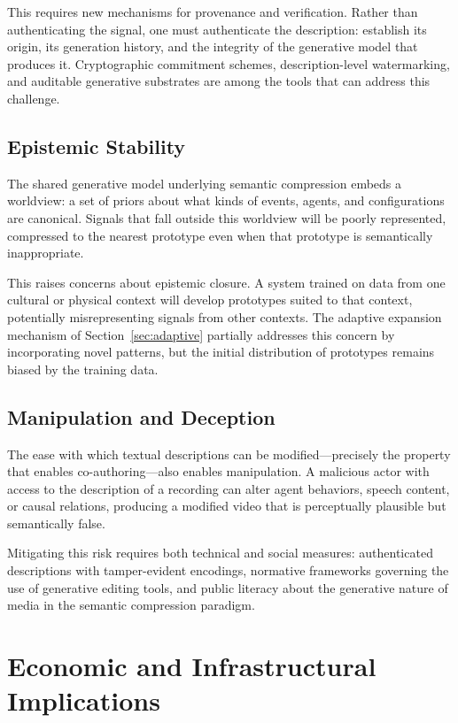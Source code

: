 \documentclass[12pt,a4paper]{article}
\theoremstyle{definition}
\theoremstyle{remark}
\begin{document}
This requires new mechanisms for provenance and verification. Rather than authenticating the signal, one must authenticate the description: establish its origin, its generation history, and the integrity of the generative model that produces it. Cryptographic commitment schemes, description-level watermarking, and auditable generative substrates are among the tools that can address this challenge.

\subsection{Epistemic Stability}

The shared generative model underlying semantic compression embeds a worldview: a set of priors about what kinds of events, agents, and configurations are canonical. Signals that fall outside this worldview will be poorly represented, compressed to the nearest prototype even when that prototype is semantically inappropriate.

This raises concerns about epistemic closure. A system trained on data from one cultural or physical context will develop prototypes suited to that context, potentially misrepresenting signals from other contexts. The adaptive expansion mechanism of Section~\ref{sec:adaptive} partially addresses this concern by incorporating novel patterns, but the initial distribution of prototypes remains biased by the training data.

\subsection{Manipulation and Deception}

The ease with which textual descriptions can be modified---precisely the property that enables co-authoring---also enables manipulation. A malicious actor with access to the description of a recording can alter agent behaviors, speech content, or causal relations, producing a modified video that is perceptually plausible but semantically false.

Mitigating this risk requires both technical and social measures: authenticated descriptions with tamper-evident encodings, normative frameworks governing the use of generative editing tools, and public literacy about the generative nature of media in the semantic compression paradigm.

\section{Economic and Infrastructural Implications}
\label{sec:economics}
\end{document}
